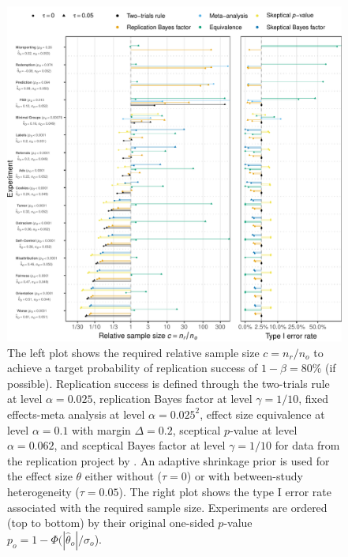 \begin{subappendices}
\begin{figure}[!htb]
\begin{knitrout}
\color{fgcolor}
\includegraphics[width=\maxwidth]{images/paper3/sup-ssd-protzko-1}
\end{knitrout}
\caption{The left plot shows the required relative sample size $c = n_r/n_o$ to
  achieve a target probability of replication success of $1 - \beta = 80$\% (if
  possible). Replication success is defined through the two-trials rule at level
  $\alpha = 0.025$, replication Bayes factor at level $\gamma = 1/10$, fixed
  effects-meta analysis at level $\alpha = 0.025^{2}$, effect size equivalence
  at level $\alpha = 0.1$ with margin $\Delta = 0.2$, sceptical $p$-value at
  level $\alpha = 0.062$, and sceptical Bayes factor at level $\gamma = 1/10$
  for data from the replication project by \citet{Protzko2020}. An adaptive
  shrinkage prior is used for the effect size $\theta$ either without
  ($\tau = 0$) or with between-study heterogeneity ($\tau = 0.05$). The right
  plot shows the type I error rate associated with the required sample size.
  Experiments are ordered (top to bottom) by their original one-sided $p$-value
  $p_{o} = 1 - \Phi(|\hat{\theta}_{o}|/\sigma_{o}$).}
\label{fig3sup:ssd-all-shrink}
\end{figure}



\end{subappendices}
